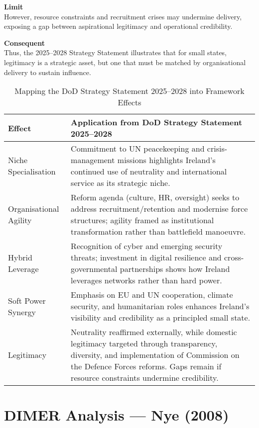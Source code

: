 \textbf{Limit} \\
However, resource constraints and recruitment crises may undermine delivery, exposing a gap between aspirational legitimacy and operational credibility.  

\textbf{Consequent} \\
Thus, the 2025--2028 Strategy Statement illustrates that for small states, legitimacy is a strategic asset, but one that must be matched by organisational delivery to sustain influence.  

\begin{table}[h!]
	\centering
	\caption{Mapping the DoD Strategy Statement 2025--2028 into Framework Effects}
	\begin{tabular}{|p{3cm}|p{11cm}|}
		\hline
		\textbf{Effect} & \textbf{Application from DoD Strategy Statement 2025--2028 \parencite{DOD_2025}} \\
		\hline
		Niche Specialisation & Commitment to UN peacekeeping and crisis-management missions highlights Ireland’s continued use of neutrality and international service as its strategic niche. \\ 
		\hline
		Organisational Agility & Reform agenda (culture, HR, oversight) seeks to address recruitment/retention and modernise force structures; agility framed as institutional transformation rather than battlefield manoeuvre. \\ 
		\hline
		Hybrid Leverage & Recognition of cyber and emerging security threats; investment in digital resilience and cross-governmental partnerships shows how Ireland leverages networks rather than hard power. \\ 
		\hline
		Soft Power Synergy & Emphasis on EU and UN cooperation, climate security, and humanitarian roles enhances Ireland’s visibility and credibility as a principled small state. \\ 
		\hline
		Legitimacy & Neutrality reaffirmed externally, while domestic legitimacy targeted through transparency, diversity, and implementation of Commission on the Defence Forces reforms. Gaps remain if resource constraints undermine credibility. \\ 
		\hline
	\end{tabular}
\end{table}

\section*{DIMER Analysis — Nye (2008)}

